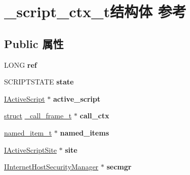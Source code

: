 \hypertarget{struct__script__ctx__t}{}\section{\+\_\+script\+\_\+ctx\+\_\+t结构体 参考}
\label{struct__script__ctx__t}
\subsection*{Public 属性}
\begin{DoxyCompactItemize}
\item 
\mbox{\label{struct__script__ctx__t_ac8b8228bbcc14924f0a75e6c250843d0}} 
L\+O\+NG {\bfseries ref}
\item 
\mbox{\label{struct__script__ctx__t_a18693ab42c9145fee172410314c2dbd2}} 
S\+C\+R\+I\+P\+T\+S\+T\+A\+TE {\bfseries state}
\item 
\mbox{\label{struct__script__ctx__t_a241ef87041958b0659ff8b409b0a15be}} 
\hyperlink{interface_i_active_script}{I\+Active\+Script} $\ast$ {\bfseries active\+\_\+script}
\item 
\mbox{\label{struct__script__ctx__t_a5641bf66f2edd21b9e7978ef83f506b0}} 
\hyperlink{interfacestruct}{struct} \hyperlink{struct__call__frame__t}{\+\_\+call\+\_\+frame\+\_\+t} $\ast$ {\bfseries call\+\_\+ctx}
\item 
\mbox{\label{struct__script__ctx__t_ab6fd0edf07643f9b9ed577e6d4308c82}} 
\hyperlink{structnamed__item__t}{named\+\_\+item\+\_\+t} $\ast$ {\bfseries named\+\_\+items}
\item 
\mbox{\label{struct__script__ctx__t_a3cd684f25086c882abe83c70f85d73c2}} 
\hyperlink{interface_i_active_script_site}{I\+Active\+Script\+Site} $\ast$ {\bfseries site}
\item 
\mbox{\label{struct__script__ctx__t_ae67ee716cedbb7b672b446b5a0b984d1}} 
\hyperlink{interface_i_internet_host_security_manager}{I\+Internet\+Host\+Security\+Manager} $\ast$ {\bfseries secmgr}
\item 
\mbox{\label{struct__script__ctx__t_acffcfbc5c5f9a0db77b6daec4153f508}} 

\end{DoxyCompactItemize}
